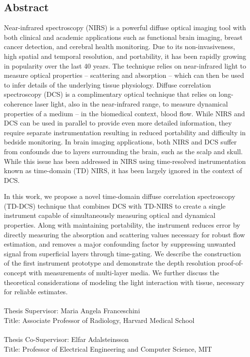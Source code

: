 \subsection*{Abstract}{\small{}\normalsize
Near-infrared spectroscopy (NIRS) is a powerful diffuse optical imaging tool with both clinical and academic applications such as functional brain imaging, breast cancer detection, and cerebral health monitoring. Due to its non-invasiveness, high spatial and temporal resolution, and portability, it has been rapidly growing in popularity over the last 40 years. The technique relies on near-infrared light to measure optical properties -- scattering and absorption -- which can then be used to infer details of the underlying tissue physiology. Diffuse correlation spectroscopy (DCS)  is a complimentary optical technique that relies on long-coherence laser light, also in the near-infrared range, to measure dynamical properties of a medium -- in the biomedical context, blood flow. While NIRS and DCS can be used in parallel to provide even more detailed information, they require separate instrumentation resulting in reduced portability and difficulty in bedside monitoring. In brain imaging applications, both NIRS and DCS suffer from confounds due to layers surrounding the brain, such as the scalp and skull. While this issue has been addressed in NIRS using time-resolved instrumentation known as time-domain (TD) NIRS, it has been largely ignored in the context of DCS. 

In this work, we propose a novel time-domain diffuse correlation spectroscopy (TD-DCS) technique that combines DCS with TD-NIRS to create a single instrument capable of simultaneously measuring optical and dynamical properties. Along with maintaining portability, the instrument reduces error by directly measuring the absorption and scattering values necessary for robust flow estimation, and removes a major confounding factor by suppressing unwanted signal from superficial layers through time-gating. We describe the construction of the first instrument prototype and demonstrate the depth resolution proof-of-concept with measurements of multi-layer media. We further discuss the theoretical considerations of modeling the light interaction with tissue, necessary for reliable estimates.
\\
\\
Thesis Supervisor: Maria Angela Franceschini \\ 
Title: Associate Professor of Radiology, Harvard Medical School
\\
\\
Thesis Co-Supervisor: Elfar Adalsteinsson \\ 
Title: Professor of Electrical Engineering and Computer Science, MIT
}
\cleardoublepage

